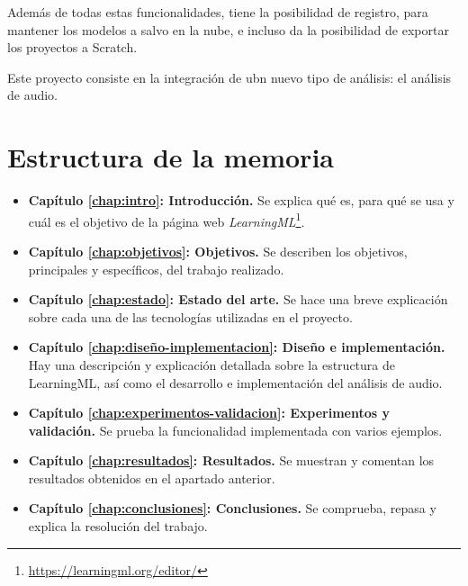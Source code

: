 \documentclass[a4paper, 12pt]{book}
\begin{document}
Además de todas estas funcionalidades, tiene la posibilidad de registro, para mantener los modelos a salvo en la nube, e incluso da la posibilidad de exportar los proyectos a Scratch.

Este proyecto consiste en la integración de ubn nuevo tipo de análisis: el análisis de audio.

\section{Estructura de la memoria}
\label{sec:estructura}

\begin{itemize}
  \item \textbf{Capítulo \ref{chap:intro}: Introducción. } Se explica qué es, para qué se usa  y cuál es el objetivo de la página web \textit{LearningML}\footnote{\url{https://learningml.org/editor/}}.
  
  \item \textbf{Capítulo \ref{chap:objetivos}: Objetivos. } Se describen los objetivos, principales y específicos, del trabajo realizado.
  
  \item \textbf{Capítulo \ref{chap:estado}: Estado del arte. } Se hace una breve explicación sobre cada una de las tecnologías utilizadas en el proyecto.
  
  \item \textbf{Capítulo \ref{chap:diseño-implementacion}: Diseño e implementación. } Hay una descripción y explicación detallada sobre la estructura de LearningML, así como el desarrollo e implementación del análisis de audio.
  
  \item \textbf{Capítulo \ref{chap:experimentos-validacion}: Experimentos y validación. } Se prueba la funcionalidad implementada con varios ejemplos.
  
  \item \textbf{Capítulo \ref{chap:resultados}: Resultados. } Se muestran y comentan los resultados obtenidos en el apartado anterior.
  
  \item \textbf{Capítulo \ref{chap:conclusiones}: Conclusiones. } Se comprueba, repasa y explica la resolución del trabajo.
 
\end{itemize}

\end{document}

